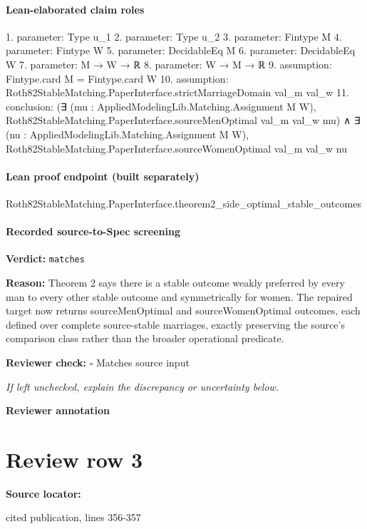 \documentclass[10pt]{article}
\newcommand{\reviewerbox}{%
  \par\noindent\fbox{\parbox{0.96\linewidth}{\rule{0pt}{0.38in}}}\par
}
\newcommand{\reviewmatch}[1]{%
  \par\noindent\textbf{Reviewer check:} $\square$\; #1\par
  \noindent\emph{If left unchecked, explain the discrepancy or uncertainty below.}\par
}
\begin{document}
\paragraph{Lean-elaborated claim roles}\begin{ReviewVerbatim}
1. parameter: Type u_1
2. parameter: Type u_2
3. parameter: Fintype M
4. parameter: Fintype W
5. parameter: DecidableEq M
6. parameter: DecidableEq W
7. parameter: M → W → ℝ
8. parameter: W → M → ℝ
9. assumption: Fintype.card M = Fintype.card W
10. assumption: Roth82StableMatching.PaperInterface.strictMarriageDomain val_m val_w
11. conclusion: (∃ (mu : AppliedModelingLib.Matching.Assignment M W),
    Roth82StableMatching.PaperInterface.sourceMenOptimal val_m val_w mu) ∧
  ∃ (nu : AppliedModelingLib.Matching.Assignment M W),
    Roth82StableMatching.PaperInterface.sourceWomenOptimal val_m val_w nu
\end{ReviewVerbatim}

\paragraph{Lean proof endpoint (built separately)}\begin{ReviewVerbatim}
Roth82StableMatching.PaperInterface.theorem2_side_optimal_stable_outcomes
\end{ReviewVerbatim}

\paragraph{Recorded source-to-Spec screening}
\textbf{Verdict:} \texttt{matches}
\\
{\raggedright
\textbf{Reason:} Theorem 2 says there is a stable outcome weakly preferred by every man to every other stable outcome and symmetrically for women.\allowbreak{}  The repaired target now returns sourceMenOptimal and sourceWomenOptimal outcomes, each defined over complete source-\allowbreak{}stable marriages, exactly preserving the source's comparison class rather than the broader operational predicate.\allowbreak{}
\par}
\reviewmatch{Matches source input}
\noindent\textbf{Reviewer annotation}\par
\reviewerbox
\clearpage
\hypertarget{source-claim-fd8851b538d7c013}{}
\section*{Review row 3}
\textbf{Source locator:} {\footnotesize\raggedright cited publication, lines 356-\allowbreak{}357\par}
\end{document}
